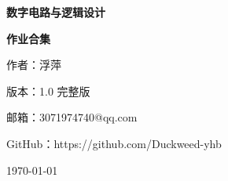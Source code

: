 \begin{titlepage}
    \centering
    \vspace*{3cm}
    
    {\Huge \bfseries 数字电路与逻辑设计 \par}
    \vspace{1.5cm}
    
    {\Large \bfseries 作业合集 \par}
    \vspace{2cm}
    {\Large 作者：浮萍 \par}
    \vspace{0.5cm}
    
    {\large 版本：1.0 完整版 \par}
    \vspace{0.5cm}
    
    {\large 邮箱：3071974740@qq.com \par}
    \vspace{0.5cm}
    
    {\large GitHub：https://github.com/Duckweed-yhb \par}
    
    \vspace{3cm}
    {\large \today \par}
\end{titlepage}